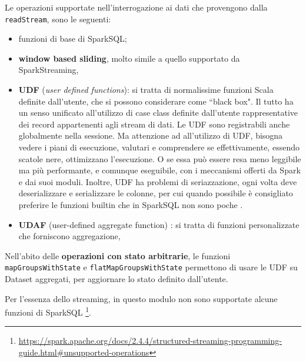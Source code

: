 \documentclass[12pt,italian]{article}
\begin{document}
Le operazioni supportate nell'interrogazione ai dati che provengono dalla \texttt{readStream}, sono le seguenti:
\begin{itemize}
	\item funzioni di base di SparkSQL;
	\item \textbf{window based sliding}, molto simile a quello supportato da SparkStreaming,
	\item \textbf{UDF} \cite{internalsSQL} (\textit{user defined functions}): si tratta di normalissime funzioni Scala definite dall'utente, che si possono considerare come ``black box". Il tutto ha un senso unificato all'utilizzo di case class definite dall'utente rappresentative dei record appartenenti agli stream di dati.
	Le UDF sono registrabili anche globalmente nella sessione.
	Ma attenzione ad all'utilizzo di UDF, bisogna vedere i piani di esecuzione, valutari e comprendere se effettivamente, essendo scatole nere, ottimizzano l'esecuzione. O se essa può essere resa meno leggibile ma più performante, e comunque eseguibile, con i meccanismi offerti da Spark e dai suoi moduli. Inoltre, UDF ha problemi di seriazzazione, ogni volta deve deserializzare e serializzare le colonne, per cui quando possibile è consigliato preferire le funzioni builtin che in SparkSQL non sono poche \cite{spark}. 
	\item \textbf{UDAF} \cite{internalsSQL} (user-defined aggregate function) : si tratta di funzioni personalizzate che forniscono aggregazione, %
\end{itemize}
Nell'abito delle \textbf{operazioni con stato arbitrarie}, le funzioni \texttt{mapGroupsWithState} e \texttt{flatMapGroupsWithState} permettono di usare le UDF su Dataset aggregati, per aggiornare lo stato definito dall'utente.

\par Per l'essenza dello streaming, in questo modulo non sono supportate alcune funzioni di SparkSQL \footnote{\url{https://spark.apache.org/docs/2.4.4/structured-streaming-programming-guide.html\#unsupported-operations}}.
\end{document}
